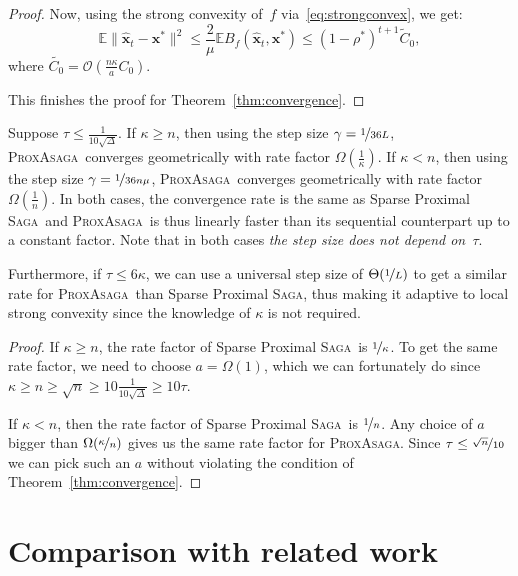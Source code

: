 \documentclass{article}
\def\EE{{\mathbb E}}
\newcommand{\PASAGA}{\textsc{ProxAsaga}}
\newcommand{\SAGA}{\textsc{Saga}}
\def\xx{{\boldsymbol x}}
\newenvironment{customcorollary}[1]
  {\renewcommand\theinnercustomcorollary{#1}\innercustomcorollary}
  {\endinnercustomcorollary}
\begin{document}
\begin{proof}
  Now, using the strong convexity of~$f$ via~\eqref{eq:strongconvex}, we get:
  \begin{equation}
    \EE \|\hat \xx_t - \xx^*\|^2 \leq \frac{2}{\mu} \EE B_f(\hat \xx_t, \xx^*) \leq (1 - \rho^*)^{t+1} \tilde{C}_0,
  \end{equation}
  where $\tilde{C_0} = \mathcal{O}(\frac{n \kappa}{a} C_0)$.

  This finishes the proof for Theorem~\ref{thm:convergence}.
\end{proof}


\begin{customcorollary}{3}[Speedup]
	Suppose $\tau \leq \frac{1}{10 \sqrt{\Delta}}$.
	If $\kappa \geq n$, then using the step size $\gamma = \nicefrac{1}{36 L}$, \PASAGA\ converges geometrically with rate factor $\Omega(\frac{1}{\kappa})$.
	If $\kappa < n$, then using the step size $\gamma = \nicefrac{1}{36 n \mu}$, \PASAGA\ converges geometrically with rate factor $\Omega(\frac{1}{n})$.
	In both cases, the convergence rate is the same as Sparse Proximal \SAGA\ and \PASAGA\ is thus linearly faster than its sequential counterpart up to a constant factor. Note that in both cases \emph{the step size does not depend on~$\tau$}.

	Furthermore, if $\tau \leq 6 \kappa$, we can use a universal step size of $\Theta(\nicefrac{1}{L})$ to get a similar rate for \PASAGA\ than Sparse Proximal \SAGA, thus making it adaptive to local strong convexity since the knowledge of $\kappa$ is not required.
\end{customcorollary}
\begin{proof}
	If $\kappa \geq n$, the rate factor of Sparse Proximal \SAGA\ is $\nicefrac{1}{\kappa}$.
	To get the same rate factor, we need to choose $a = \Omega(1)$, which we can fortunately do since $\kappa \geq n \geq \sqrt{n} \geq 10 \frac{1}{10\sqrt{\Delta}} \geq 10 \tau$.

	If $\kappa < n$, then the rate factor of Sparse Proximal \SAGA\ is $\nicefrac{1}{n}$.
	Any choice of $a$ bigger than $\Omega(\nicefrac{\kappa}{n})$ gives us the same rate factor for \PASAGA.
	Since $\tau \leq \nicefrac{\sqrt{n}}{10}$ we can pick such an $a$ without violating the condition of Theorem~\ref{thm:convergence}.
\end{proof}


\clearpage


\section{Comparison with related work}\label{apx:related_work}
\end{document}
